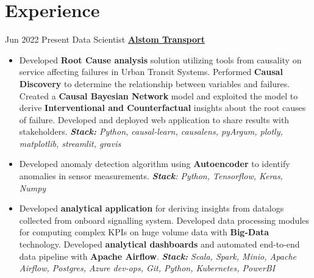 \documentclass[letterpaper]{DS_class_file} %
\begin{document}
\makeprofile %




\section{Experience}

\begin{twenty}
    \twentyitem
		{Jun 2022}
		{Present}
		{\hspace{0.3cm}Data Scientist}
		{\href{https://www.alstom.com/alstom-india}{\textbf{Alstom Transport}}}
		{}
		{\begin{itemize}
        \item Developed \textbf{Root Cause analysis} solution utilizing tools from causality on service affecting failures in Urban Transit Systems. Performed \textbf{Causal Discovery} to determine the relationship between variables and failures. Created a \textbf{Causal Bayesian Network} model and exploited the model to derive \textbf{Interventional and Counterfactual} insights about the root causes of failure. Developed and deployed web application to share results with stakeholders. \newline \textit{\textbf{Stack:} Python, causal-learn, causalens, pyArgum, plotly, matplotlib, streamlit, gravis}
        \item Developed anomaly detection algorithm using \textbf{Autoencoder} to identify anomalies in sensor measurements. \newline \textit{\textbf{Stack}: Python, Tensorflow, Keras, Numpy}  
        \item Developed \textbf{analytical application} for deriving insights from datalogs collected from onboard signalling system. Developed data processing modules for computing complex KPIs on huge volume data with \textbf{Big-Data} technology. Developed \textbf{analytical dashboards} and automated end-to-end data pipeline with \textbf{Apache Airflow}. \newline \textit{\textbf{Stack:} Scala, Spark, Minio, Apache Airflow, Postgres, Azure dev-ops, Git, Python, Kubernetes, PowerBI}

\end{itemize}}
\end{twenty}
\end{document}

